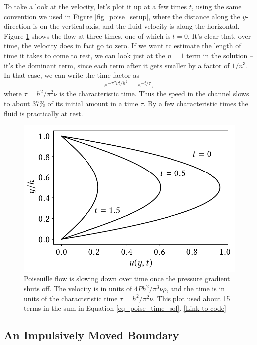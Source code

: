 To take a look at the velocity, let's plot it up at a few times $t$, using the same convention we used in Figure \ref{fig_poise_setup}, where the distance along the $y$-direction is on the vertical axis, and the fluid velocity is along the horizontal.  Figure \ref{fig_poise_time} shows the flow at three times, one of which is $t=0$.  It's clear that, over time, the velocity does in fact go to zero.  If we want to estimate the length of time it takes to come to rest, we can look just at the $n=1$ term in the solution -- it's the dominant term, since each term after it gets smaller by a factor of $1/n^3$.  In that case, we can write the time factor as
\[
e^{-\pi^2 \nu t/h^2} = e^{-t/\tau},
\]
where $\tau = h^2/\pi^2 \nu$ is the characteristic time.  Thus the speed in the channel slows to about 37\% of its initial amount in a time $\tau$.  By a few characteristic times the fluid is practically at rest.

\begin{figure}
\centering
\includegraphics[width=0.7\linewidth]{Figures/Chapter2/fig_poise_time}
\caption{Poiseuille flow is slowing down over time once the pressure gradient shuts off. The velocity is in units of $4Ph^2 /\pi^3 \nu \rho$, and the time is in units of the characteristic time  $\tau = h^2 / \pi^2 \nu$. This plot used about 15 terms in the sum in Equation \ref{eq_poise_time_sol}. \href{https://nbviewer.jupyter.org/github/josephmacmillan/IntroFluidDynamics/blob/master/Jupyter/2-ViscousFluids.ipynb\#Figure-2.2:-Poiseuille-flow-slowing-down-over-time}{[Link to code]}}
\label{fig_poise_time}
\end{figure}


\subsection{An Impulsively Moved Boundary}
\label{sec_imp}

